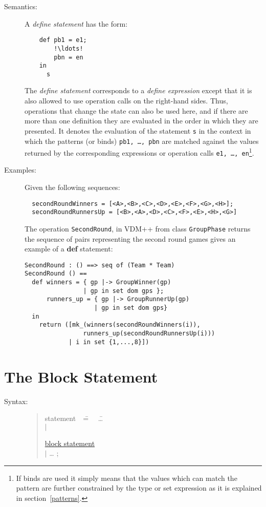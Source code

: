 \documentclass{overturerepchap}
\newcommand{\Rule}[2]{
  \begin{quote}\begin{tabbing}
    #1\index{#1}\ \ \= = \ \ \= #2  ; %

  \end{tabbing}\end{quote}
  }
\newcommand{\Ruleref}[1]{
  \hyperlink{rule:#1}{#1}}
\newcommand{\dsep}{\\ \> $|$ \>}
\newcommand{\keyw}[1]{{\bf\ttfamily #1}}
\begin{document}
{\begin{description}
\item[Semantics:] A {\it define statement} has the form:
  \begin{lstlisting}
    def pb1 = e1;
        !\ldots!
        pbn = en
    in
      s
  \end{lstlisting}
  The {\it define statement} corresponds to a {\it define expression}
  except that it is also allowed to use operation calls on the right-hand
  sides. Thus, operations that change the state can also be used here, and
  if there are more than one definition they are evaluated in the order in
  which they are presented.  It denotes the evaluation of the statement
  {\tt s} in the context in which the patterns (or binds) {\tt pb1, \ldots,
    pbn} are matched against the values returned by the corresponding
  expressions or operation calls {\tt e1, \ldots, en}\footnote{If binds are
    used it simply means that the values which can match the pattern are
    further constrained by the type or set expression as it is explained in
    section~\ref{patterns}.}.

\item[Examples:] Given the following sequences:
  \begin{lstlisting}
  secondRoundWinners = [<A>,<B>,<C>,<D>,<E>,<F>,<G>,<H>];
  secondRoundRunnersUp = [<B>,<A>,<D>,<C>,<F>,<E>,<H>,<G>]
  \end{lstlisting}
  The operation \texttt{SecondRound}, in VDM++ from class \texttt{GroupPhase}
  returns the sequence of pairs
  representing the second round games gives an example of a \keyw{def}
  statement:
  \begin{lstlisting}
SecondRound : () ==> seq of (Team * Team)
SecondRound () ==
  def winners = { gp |-> GroupWinner(gp)
                | gp in set dom gps };
      runners_up = { gp |-> GroupRunnerUp(gp)
                   | gp in set dom gps}
  in
    return ([mk_(winners(secondRoundWinners(i)),
                runners_up(secondRoundRunnersUp(i)))
            | i in set {1,...,8}])
  \end{lstlisting}

\end{description}

\section{The Block Statement} \label{dcl-stmt}

\begin{description}
\item[Syntax:]
  \Rule{statement}{
    \ldots \dsep
    \Ruleref{block statement} \dsep \ldots
    }


\end{description}}
\end{document}
